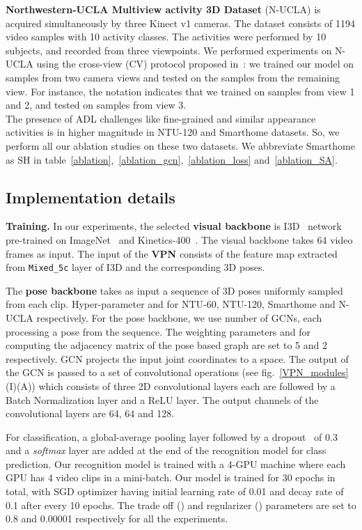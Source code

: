 \documentclass[runningheads]{llncs}
\begin{document}
\noindent\textbf{Northwestern-UCLA Multiview activity 3D Dataset} (N-UCLA) is acquired simultaneously by three Kinect v1 cameras. The dataset consists of 1194 video samples with 10 activity classes. The activities were performed by 10 subjects, and recorded from three viewpoints. We performed experiments on N-UCLA using the cross-view (CV) protocol proposed in~\cite{nucla}: we trained our model on samples from two camera views and tested on the samples from the remaining view. For instance, the notation  indicates that we trained on samples from view 1 and 2, and tested on samples from view 3. \\
\noindent The presence of ADL challenges like fine-grained and similar appearance activities is in higher magnitude in NTU-120 and Smarthome datasets. So, we perform all our ablation studies on these two datasets. We abbreviate Smarthome as SH in table~\ref{ablation},~\ref{ablation_gcn},~\ref{ablation_loss} and~\ref{ablation_SA}.


\subsection{Implementation details}
\textbf{Training.} In our experiments, the selected \textbf{visual backbone} is I3D~\cite{i3d} network pre-trained on ImageNet~\cite{imagenet_cvpr09} and Kinetics-400~\cite{kinetics}. The visual backbone takes 64 video frames as input. The input of the \textbf{VPN} consists of the feature map extracted from \texttt{Mixed\_5c} layer of I3D and the corresponding 3D poses.

\noindent The \textbf{pose backbone} takes as input a sequence of  3D poses uniformly sampled from each clip. Hyper-parameter  and  for NTU-60, NTU-120, Smarthome and N-UCLA respectively. \noindent For the pose backbone, we use  number of GCNs, each processing a pose from the sequence. The weighting parameters  and  for computing the adjacency matrix of the pose based graph are set to 5 and 2 respectively. GCN projects the input joint coordinates to a  space. The output of the GCN is passed to a set of convolutional operations (see fig.~\ref{VPN_modules}(I)(A)) which consists of three 2D convolutional layers each are followed by a Batch Normalization layer and a ReLU layer. The output channels of the convolutional layers are 64, 64 and 128. 

\noindent For classification, a global-average pooling layer followed by a dropout~\cite{Dropout} of 0.3 and a \textit{softmax} layer are added at the end of the recognition model for class prediction. Our recognition model is trained with a 4-GPU machine where each GPU has 4 video clips in a mini-batch. Our model is trained for 30 epochs in total, with SGD optimizer having initial learning rate of 0.01 and decay rate of 0.1 after every 10 epochs. The trade off () and regularizer () parameters are set to 0.8 and 0.00001 respectively for all the experiments.
\end{document}
